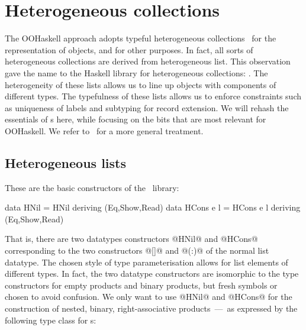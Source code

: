 





\section{Heterogeneous collections}
\label{S:HList}

The OOHaskell approach adopts typeful heterogeneous
collections~\cite{HLIST-HW04} for the representation of objects, and
for other purposes. In fact, all sorts of heterogeneous collections
are derived from heterogeneous list. This observation gave the name to
the Haskell library for heterogeneous collections: \HList. The
heterogeneity of these lists allows us to line up objects with
components of different types. The typefulness of these lists allows
us to enforce constraints such as uniqueness of labels and subtyping
for record extension. We will rehash the essentials of \HList{}s here,
while focusing on the bits that are most relevant for OOHaskell. We
refer to~\cite{HLIST-HW04} for a more general treatment.






\subsection{Heterogeneous lists}

These are the basic constructors of the \HList\ library:

\begin{code}
 data HNil      = HNil       deriving (Eq,Show,Read)
 data HCons e l = HCons e l  deriving (Eq,Show,Read)
\end{code}

\noindent
That is, there are two datatypes constructors @HNil@ and @HCons@
corresponding to the two constructors @[]@ and @(:)@ of the normal
list datatype. The chosen style of type parameterisation allows for
list elements of different types. In fact, the two datatype
constructors are isomorphic to the type constructors for empty
products and binary products, but fresh symbols or chosen to avoid
confusion. We only want to use @HNil@ and @HCons@ for the construction
of nested, binary, right-associative products~---~as expressed by the
following type class for \HList{}s:

